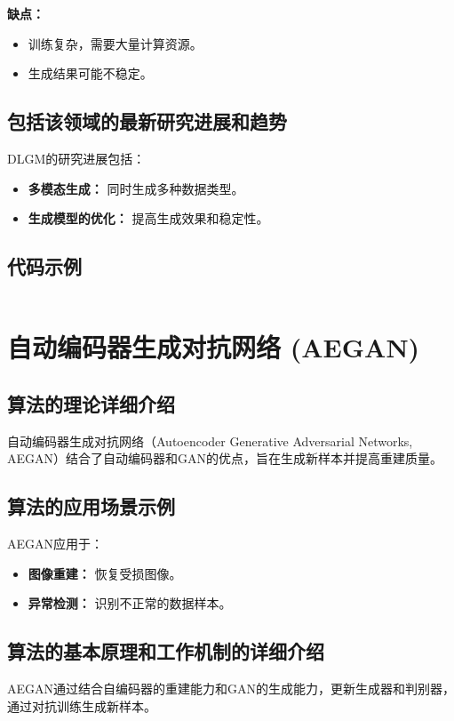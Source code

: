 \textbf{缺点：}
\begin{itemize}
    \item 训练复杂，需要大量计算资源。
    \item 生成结果可能不稳定。
\end{itemize}

\subsection*{包括该领域的最新研究进展和趋势}
DLGM的研究进展包括：
\begin{itemize}
    \item \textbf{多模态生成：} 同时生成多种数据类型。
    \item \textbf{生成模型的优化：} 提高生成效果和稳定性。
\end{itemize}
\subsection*{代码示例}
\begin{lstlisting}

\end{lstlisting}


\section{自动编码器生成对抗网络 (AEGAN)}
\subsection*{算法的理论详细介绍}
自动编码器生成对抗网络（Autoencoder Generative Adversarial Networks, AEGAN）结合了自动编码器和GAN的优点，旨在生成新样本并提高重建质量。

\subsection*{算法的应用场景示例}
AEGAN应用于：
\begin{itemize}
    \item \textbf{图像重建：} 恢复受损图像。
    \item \textbf{异常检测：} 识别不正常的数据样本。
\end{itemize}

\subsection*{算法的基本原理和工作机制的详细介绍}
AEGAN通过结合自编码器的重建能力和GAN的生成能力，更新生成器和判别器，通过对抗训练生成新样本。

